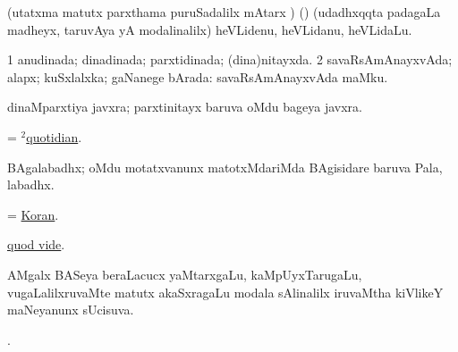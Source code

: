 \bentry
{}
\gl{\sakirx}
\bmng
(utatxma matutx parxthama puruSadalilx mAtarx \parx) (\pArxparx) (udadhxqqta padagaLa madheyx, taruvAya yA modalinalilx) heVLidenu, heVLidanu, heVLidaLu. 
\emng
\eentry

\bentry
{}
\gl{\gu}
\bmng
\bnum
\num{1} anudinada; dinadinada; parxtidinada; (dina)nitayxda. 
\num{2} savaRsAmAnayxvAda; alapx; kuSxlalxka; gaNanege bArada:  savaRsAmAnayxvAda maMku. 
\enum
\emng
\eentry

\bentry
{}
\gl{\nA}
\bmng
dinaMparxtiya javxra; parxtinitayx baruva oMdu bageya javxra. 
\emng
\eentry

\bentry
{}
\gl{\nA}
\bmng
= \hyperlink{quotidian(2)}{$^2$quotidian}. 
\emng
\eentry

\bentry
{}
\gl{\nA}
\bmng
BAgalabadhx; oMdu motatxvanunx matotxMdariMda BAgisidare baruva Pala, labadhx. 
\emng
\eentry

\bentry
{}
\gl{\nA}
\bmng
= \hyperref{kandict_k.pdf}{K}{Koran}{Koran}. 
\emng
\eentry

\bentry
{}
\gl{\saMkiSx}
\bmng
\hyperlink{quod vide}{quod vide}. 
\emng
\eentry

\bentry
{}
\gl{\gu}
\bmng
AMgalx BASeya beraLacucx yaMtarxgaLu, kaMpUyxTarugaLu, \mo vugaLalilxruvaMte  matutx  akaSxragaLu modala sAlinalilx iruvaMtha kiVlikeY maNeyanunx sUcisuva. 
\emng
\eentry

\bentry
{}
\gl{\saMkiSx}
\bmng
{}. 
\emng
\eentry


